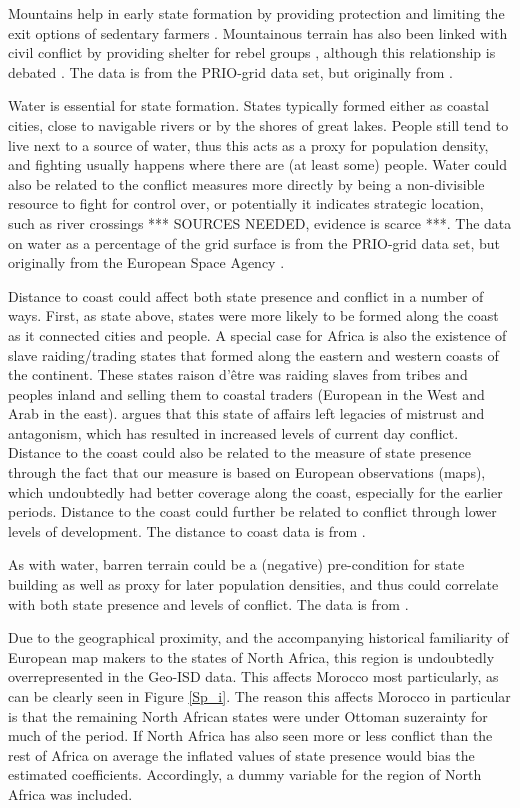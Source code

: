 \documentclass[12pt]{article}
\begin{document}
Mountains help in early state formation by providing protection and limiting the
exit options of sedentary farmers \citep{Carneiro1988}. Mountainous terrain has
also been linked with civil conflict by providing shelter for rebel groups
\citep{Hegre2006}, although this relationship is debated 
\citep{Buhaug2002}. The data is from the PRIO-grid data set, but originally 
from \citet{Blyth2002}. 

Water is essential for state formation. States typically formed either as
coastal cities, close to navigable rivers or by the shores of great lakes.
People still tend to live next to a source of water, thus this acts as a proxy
for population density, and fighting usually happens where there are (at least
some) people.  Water could also be related to the conflict measures more
directly by being a non-divisible resource to fight for control over, or
potentially it indicates strategic location, such as river crossings *** SOURCES
NEEDED, evidence is scarce ***. The data on water as a percentage of the grid
surface is from the PRIO-grid data set, but originally from the European Space
Agency \citep{Bontemps2009}.

Distance to coast could affect both state presence and conflict in a number of
ways. First, as state above, states were more likely to be formed along the
coast as it connected cities and people. A special case for Africa is also the
existence of slave raiding/trading states that formed along the eastern and
western coasts of the continent. These states raison d'être was raiding slaves
from tribes and peoples inland and selling them to coastal traders (European in
the West and Arab in the east). \citet{Nunn2008} argues that this state of
affairs left legacies of mistrust and antagonism, which has resulted in
increased levels of current day conflict. Distance to the coast could also be
related to the measure of state presence through the fact that our measure is
based on European observations (maps), which undoubtedly had better coverage
along the coast, especially for the earlier periods. Distance to the coast could
further be related to conflict through lower levels of development. The distance
to coast data is from \citet{Wessel1996}.

As with water, barren terrain could be a (negative) pre-condition for state
building as well as proxy for later population densities, and thus could
correlate with both state presence and levels of conflict. The data is from
\citet{Bontemps2009}.

Due to the geographical proximity, and the accompanying historical familiarity
of European map makers to the states of North Africa, this region is undoubtedly
overrepresented in the Geo-ISD data. This affects Morocco most particularly, as
can be clearly seen in Figure \ref{Sp_i}. The reason this affects Morocco in
particular is that the remaining North African states were under Ottoman
suzerainty for much of the period. If North Africa has also seen more or less
conflict than the rest of Africa on average the inflated values of state
presence would bias the estimated coefficients. Accordingly, a dummy variable
for the region of North Africa was included.
\end{document}
